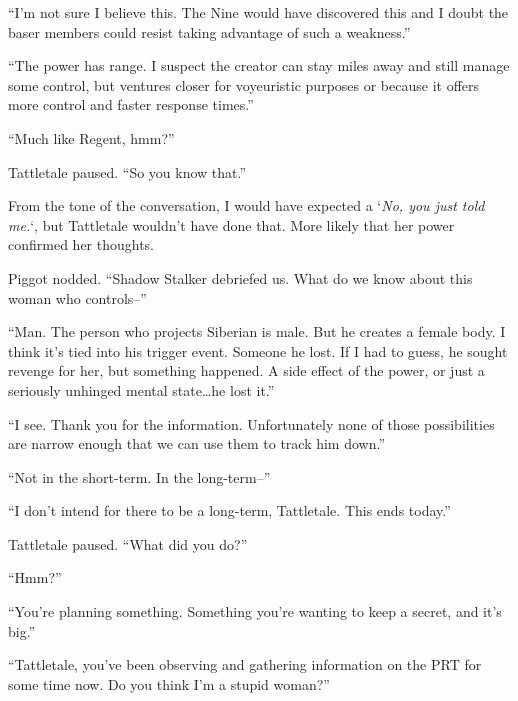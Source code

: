 ``I'm not sure I believe this.  The Nine would have discovered this and I doubt the baser members could resist taking advantage of such a weakness.''



``The power has range.  I suspect the creator can stay miles away and still manage some control, but ventures closer for voyeuristic purposes or because it offers more control and faster response times.''



``Much like Regent, hmm?''



Tattletale paused.  ``So you know that.''



From the tone of the conversation, I would have expected a `\emph{No, you just told me.}`, but Tattletale wouldn't have done that.  More likely that her power confirmed her thoughts.



Piggot nodded.  ``Shadow Stalker debriefed us.  What do we know about this woman who controls--''



``Man.  The person who projects Siberian is male.  But he creates a female body.  I think it's tied into his trigger event.  Someone he lost.  If I had to guess, he sought revenge for her, but something happened.  A side effect of the power, or just a seriously unhinged mental state\ldots he lost it.''



``I see.  Thank you for the information.  Unfortunately none of those possibilities are narrow enough that we can use them to track him down.''



``Not in the short-term.  In the long-term--''



``I don't intend for there to be a long-term, Tattletale.  This ends today.''



Tattletale paused.  ``What did you do?''



``Hmm?''



``You're planning something.  Something you're wanting to keep a secret, and it's big.''



``Tattletale, you've been observing and gathering information on the PRT for some time now.  Do you think I'm a stupid woman?''



